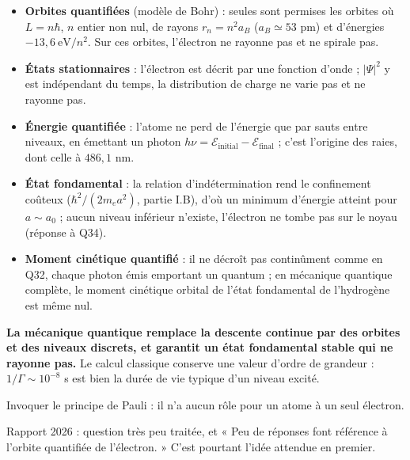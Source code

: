 \documentclass[11pt,a4paper]{article}
\providecommand{\tightlist}{\setlength{\itemsep}{0pt}\setlength{\parskip}{0pt}}
\begin{document}
\begin{itemize}
\tightlist
\item
  \textbf{Orbites quantifiées} (modèle de Bohr) : seules sont permises les orbites où \(L=n\hbar\), \(n\) entier non nul, de rayons \(r_n=n^2a_B\) (\(a_B\simeq53\) pm) et d'énergies \(-13{,}6\ \mathrm{eV}/n^2\). Sur ces orbites, l'électron ne rayonne pas et ne spirale pas.
\item
  \textbf{États stationnaires} : l'électron est décrit par une fonction d'onde ; \(|\Psi|^2\) y est indépendant du temps, la distribution de charge ne varie pas et ne rayonne pas.
\item
  \textbf{Énergie quantifiée} : l'atome ne perd de l'énergie que par sauts entre niveaux, en émettant un photon \(h\nu=\mathcal E_{\mathrm{initial}}-\mathcal E_{\mathrm{final}}\) ; c'est l'origine des raies, dont celle à \(486{,}1\) nm.
\item
  \textbf{État fondamental} : la relation d'indétermination rend le confinement coûteux (\(\hbar^2/(2m_ea^2)\), partie I.B), d'où un minimum d'énergie atteint pour \(a\sim a_0\) ; aucun niveau inférieur n'existe, l'électron ne tombe pas sur le noyau (réponse à Q34).
\item
  \textbf{Moment cinétique quantifié} : il ne décroît pas continûment comme en Q32, chaque photon émis emportant un quantum ; en mécanique quantique complète, le moment cinétique orbital de l'état fondamental de l'hydrogène est même nul.
\end{itemize}

\textbf{La mécanique quantique remplace la descente continue par des orbites et des niveaux discrets, et garantit un état fondamental stable qui ne rayonne pas.} Le calcul classique conserve une valeur d'ordre de grandeur : \(1/\Gamma\sim10^{-8}\) s est bien la durée de vie typique d'un niveau excité.

\begin{piege}

Invoquer le principe de Pauli : il n'a aucun rôle pour un atome à un seul électron.

\end{piege}

\begin{jury}

Rapport 2026 : question très peu traitée, et « Peu de réponses font référence à l'orbite quantifiée de l'électron. » C'est pourtant l'idée attendue en premier.

\end{jury}
\end{document}
